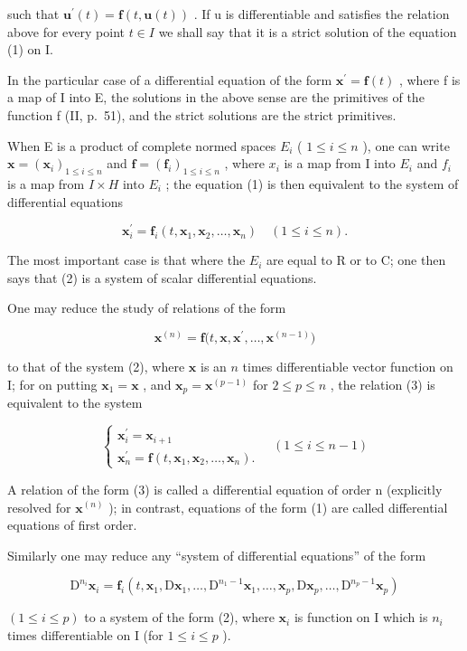 such that \(\mathbf{u}^{\prime}(t)=\mathbf{f}(t,\mathbf{u}(t))\) . If u is differentiable and satisfies the relation above for every point \(t\in I\) we shall say that it is a strict solution of the equation (1) on I.

In the particular case of a differential equation of the form \(\mathbf{x}^{\prime}=\mathbf{f}(t)\) , where f is a map of I into E, the solutions in the above sense are the primitives of the function f (II, p.~51), and the strict solutions are the strict primitives.

When E is a product of complete normed spaces \(E_{i}\) ( \(1 \leqslant i \leqslant n\) ), one can write \(\mathbf{x} = (\mathbf{x}_{i})_{1 \leqslant i \leqslant n}\) and \(\mathbf{f} = (\mathbf{f}_{i})_{1 \leqslant i \leqslant n}\) , where \(x_{i}\) is a map from I into \(E_{i}\) and \(f_{i}\) is a map from \(I \times H\) into \(E_{i}\) ; the equation (1) is then equivalent to the system of differential equations

\[
\mathbf {x} _ {i} ^ {\prime} = \mathbf {f} _ {i} (t, \mathbf {x} _ {1}, \mathbf {x} _ {2}, \dots , \mathbf {x} _ {n}) \quad (1 \leqslant i \leqslant n).\tag{2}
\]

The most important case is that where the \(E_{i}\) are equal to R or to C; one then says that (2) is a system of scalar differential equations.

One may reduce the study of relations of the form

\[
\mathbf {x} ^ {(n)} = \mathbf {f} \big (t, \mathbf {x}, \mathbf {x} ^ {\prime}, \dots , \mathbf {x} ^ {(n - 1)} \big)\tag{3}
\]

to that of the system (2), where \(\mathbf{x}\) is an \(n\) times differentiable vector function on I; for on putting \(\mathbf{x}_1 = \mathbf{x}\) , and \(\mathbf{x}_p = \mathbf{x}^{(p - 1)}\) for \(2 \leqslant p \leqslant n\) , the relation (3) is equivalent to the system

\[
\left\{ \begin{array}{l} \mathbf {x} _ {i} ^ {\prime} = \mathbf {x} _ {i + 1} \\ \mathbf {x} _ {n} ^ {\prime} = \mathbf {f} (t, \mathbf {x} _ {1}, \mathbf {x} _ {2}, \ldots , \mathbf {x} _ {n}). \end{array} \right. \quad (1 \leqslant i \leqslant n - 1)\tag{4}
\]

A relation of the form (3) is called a differential equation of order n (explicitly resolved for \(\mathbf{x}^{(n)}\) ); in contrast, equations of the form (1) are called differential equations of first order.

Similarly one may reduce any ``system of differential equations'' of the form

\[
\mathrm{D} ^ {n _ {i}} \mathbf {x} _ {i} = \mathbf {f} _ {i} (t, \mathbf {x} _ {1}, \mathrm{D} \mathbf {x} _ {1}, \dots , \mathrm{D} ^ {n _ {1} - 1} \mathbf {x} _ {1}, \dots , \mathbf {x} _ {p}, \mathrm{D} \mathbf {x} _ {p}, \dots , \mathrm{D} ^ {n _ {p} - 1} \mathbf {x} _ {p})\tag{5}
\]

\((1 \leqslant i \leqslant p)\) to a system of the form (2), where \(\mathbf{x}_i\) is function on I which is \(n_i\) times differentiable on I (for \(1 \leqslant i \leqslant p\) ).

